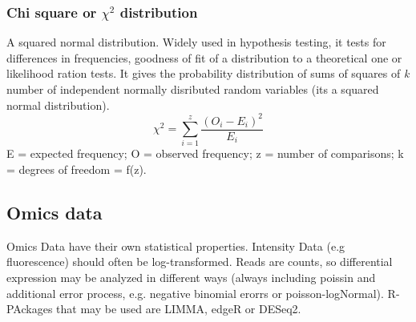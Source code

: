 \documentclass{article}
\begin{document}
\subsubsection{Chi square or $\chi ^2$ distribution}
A squared normal distribution. Widely used in hypothesis testing, it tests for differences in frequencies, goodness of fit of a distribution to a theoretical one or likelihood ration tests. It gives the probability distribution of sums of squares of \textit{k} number of independent normally disributed random variables (its a squared normal distribution).
$$\chi^2 = \sum_{i=1}^{z}\frac{(O_i -E_i)^2}{E_i}$$
E = expected frequency; O = observed frequency; z = number of comparisons; k = degrees of freedom = f(z).

\subsection{Omics data}
Omics Data have their own statistical properties. Intensity Data (e.g fluorescence) should often be log-transformed. Reads are counts, so differential expression may be analyzed in different ways (always including poissin and additional error process, e.g. negative binomial erorrs or poisson-logNormal). R-PAckages that may be used are LIMMA, edgeR or DESeq2.
\end{document}
